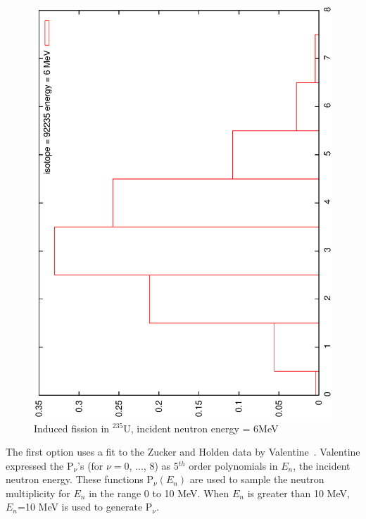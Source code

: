 \begin{figure}[ht]
\begin{center}
\includegraphics[scale=0.4, angle=-90]{eps/U235_6MeV_nudist.eps}
\end{center}
\caption{Induced fission in $^{235}$U, incident neutron energy = 6MeV}
\label{235U induced fission 6MeV}
\end{figure}

The first option uses a fit to the Zucker
and Holden data \cite{Zucker and Holden 1986} by
Valentine~\cite{Valentine 1996,Valentine 2000}. Valentine
expressed the P$_{\nu}$'s (for $\nu=0$, ..., 8) as 5$^{th}$ order
polynomials in $E_n$, the incident neutron energy. These functions 
P$_{\nu}(E_n)$ are used to sample the neutron multiplicity for 
$E_n$ in the range 0 to 10 MeV.  When $E_n$ is greater than 10 MeV, 
$E_n$=10 MeV is used to generate P$_{\nu}$.

